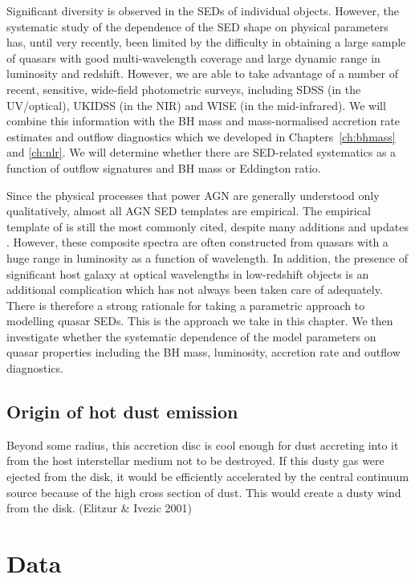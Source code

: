 Significant diversity is observed in the SEDs of individual objects. 
However, the systematic study of the dependence of the SED shape on physical parameters has, until very recently, been limited by the difficulty in obtaining a large sample of quasars with good multi-wavelength coverage and large dynamic range in luminosity and redshift. 
However, we are able to take advantage of a number of recent, sensitive, wide-field photometric surveys, including SDSS (in the UV/optical), UKIDSS (in the NIR) and WISE (in the mid-infrared).
We will combine this information with the BH mass and mass-normalised accretion rate estimates and outflow diagnostics which we developed in Chapters~\ref{ch:bhmass} and \ref{ch:nlr}. 
We will determine whether there are SED-related systematics as a function of outflow signatures and BH mass or Eddington ratio. 

Since the physical processes that power AGN are generally understood only qualitatively, almost all AGN SED templates are empirical. 
The empirical template of \citet{elvis94} is still the most commonly cited, despite many additions and updates \citep[e.g.][]{polletta00, kuraszkiewicz03, risaliti04, richards06,  polletta07, lusso10, shang11, marchese12, trichas12}. 
However, these composite spectra are often constructed from quasars with a huge range in luminosity as a function of wavelength. 
In addition, the presence of significant host galaxy at optical wavelengths in low-redshift objects is an additional complication which has not always been taken care of adequately. 
There is therefore a strong rationale for taking a parametric approach to modelling quasar SEDs. 
This is the approach we take in this chapter. 
We then investigate whether the systematic dependence of the model parameters on quasar properties including the BH mass, luminosity, accretion rate and outflow diagnostics. 

\subsection{Origin of hot dust emission}

Beyond some radius, this accretion disc is cool enough for dust accreting into it from the host interstellar medium not to be destroyed. 
If this dusty gas were ejected from the disk, it would be efficiently accelerated by the central continuum source because of the high cross section of dust. 
This would create a dusty wind from the disk. 
(Elitzur \& Ivezic 2001)

\section{Data}

